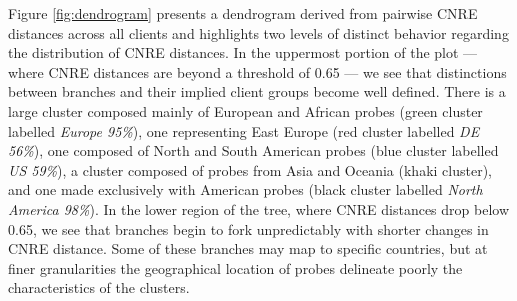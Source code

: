 Figure \ref{fig:dendrogram} presents a dendrogram derived from pairwise CNRE
distances across all clients and highlights two levels of distinct behavior
regarding the distribution of CNRE distances. In the uppermost portion of
the plot --- where CNRE distances are beyond a threshold of 0.65 --- we see
that distinctions between branches and their implied client groups become well
defined. 
There is a large cluster composed mainly of European and African probes (green 
cluster labelled \emph{Europe 95\%}), one representing East Europe (red cluster 
labelled \emph{DE 56\%}), one composed of North and South American probes (blue
cluster labelled \emph{US 59\%}), a cluster composed of probes from Asia
and Oceania (khaki cluster), and one made exclusively with American probes
(black cluster labelled \emph{North America 98\%}).
In the lower region of the tree, where CNRE distances drop below 0.65, we see 
that branches begin to fork unpredictably with shorter changes in CNRE distance. 
Some of these branches may map to specific countries, but at finer granularities
the geographical location of probes delineate poorly the characteristics
of the clusters.



